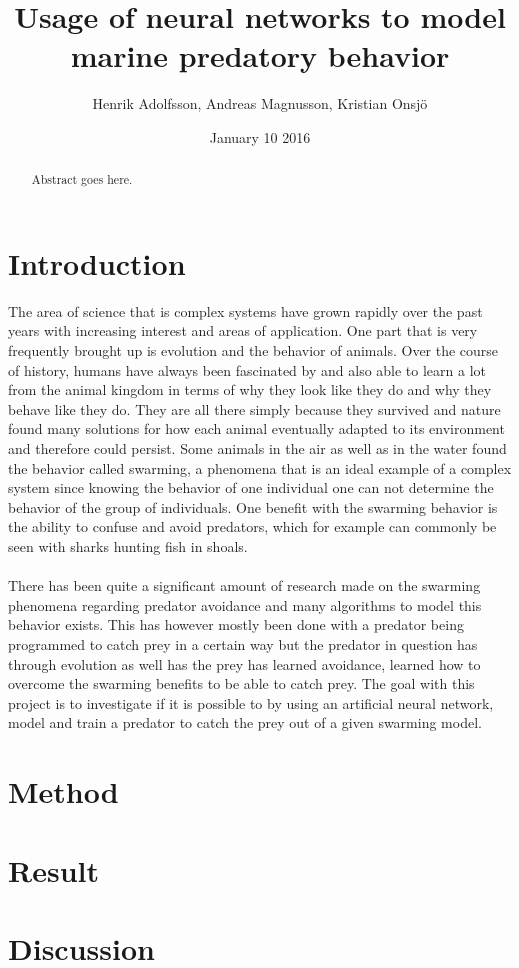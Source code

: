 \documentclass[12pt,A4]{article}
\title{Usage of neural networks to model marine predatory behavior}
\author{Henrik Adolfsson, Andreas Magnusson, Kristian Onsj\"o}
\date{January 10 2016}
\begin{document}
\parindent=0cm

\maketitle

\begin{abstract}
Abstract goes here.
\end{abstract}

\section{Introduction}
The area of science that is complex systems have grown rapidly over the past years with increasing interest and areas of application. One part that is very frequently brought up is evolution and the behavior of animals. Over the course of history, humans have always been fascinated by and also able to learn a lot from the animal kingdom in terms of why they look like they do and why they behave like they do. They are all there simply because they survived and nature found many solutions for how each animal eventually adapted to its environment and therefore could persist. Some animals in the air as well as in the water found the behavior called swarming, a phenomena that is an ideal example of a complex system since knowing the behavior of one individual one can not determine the behavior of the group of individuals. One benefit with the swarming behavior is the ability to confuse and avoid predators, which for example can commonly be seen with sharks hunting fish in shoals.\\
\\
There has been quite a significant amount of research made on the swarming phenomena regarding predator avoidance and many algorithms to model this behavior exists. This has however mostly been done with a predator being programmed to catch prey in a certain way but the predator in question has through evolution as well has the prey has learned avoidance, learned how to overcome the swarming benefits to be able to catch prey. The goal with this project is to investigate if it is possible to by using an artificial neural network, model and train a predator to catch the prey out of a given swarming model.

\section{Method}

\section{Result}

\section{Discussion}
\end{document}

